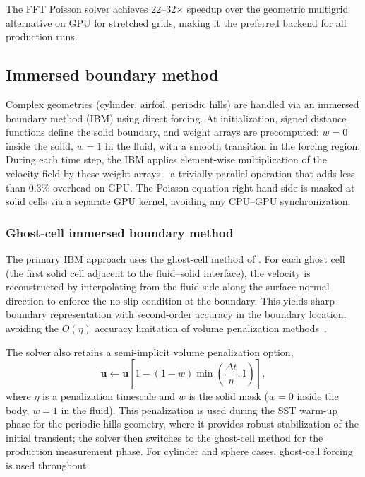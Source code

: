 The FFT Poisson solver achieves 22--32$\times$ speedup over the geometric multigrid alternative on GPU for stretched grids, making it the preferred backend for all production runs.

\subsection{Immersed boundary method}

Complex geometries (cylinder, airfoil, periodic hills) are handled via an immersed boundary method (IBM) using direct forcing.
At initialization, signed distance functions define the solid boundary, and weight arrays are precomputed: $w = 0$ inside the solid, $w = 1$ in the fluid, with a smooth transition in the forcing region.
During each time step, the IBM applies element-wise multiplication of the velocity field by these weight arrays---a trivially parallel operation that adds less than 0.3\% overhead on GPU.
The Poisson equation right-hand side is masked at solid cells via a separate GPU kernel, avoiding any CPU--GPU synchronization.

\subsubsection{Ghost-cell immersed boundary method}
\label{sec:ghost_cell_ibm}

The primary IBM approach uses the ghost-cell method of \citet{Fadlun2000}.
For each ghost cell (the first solid cell adjacent to the fluid--solid interface), the velocity is reconstructed by interpolating from the fluid side along the surface-normal direction to enforce the no-slip condition at the boundary.
This yields sharp boundary representation with second-order accuracy in the boundary location, avoiding the $O(\eta)$ accuracy limitation of volume penalization methods~\citep{Angot1999}.

The solver also retains a semi-implicit volume penalization option,
\begin{equation}
    \bm{u} \leftarrow \bm{u} \left[ 1 - (1 - w) \min\!\left(\frac{\Delta t}{\eta}, 1\right) \right],
    \label{eq:volume_penalization}
\end{equation}
where $\eta$ is a penalization timescale and $w$ is the solid mask ($w=0$ inside the body, $w=1$ in the fluid).
This penalization is used during the SST warm-up phase for the periodic hills geometry, where it provides robust stabilization of the initial transient; the solver then switches to the ghost-cell method for the production measurement phase.
For cylinder and sphere cases, ghost-cell forcing is used throughout.

